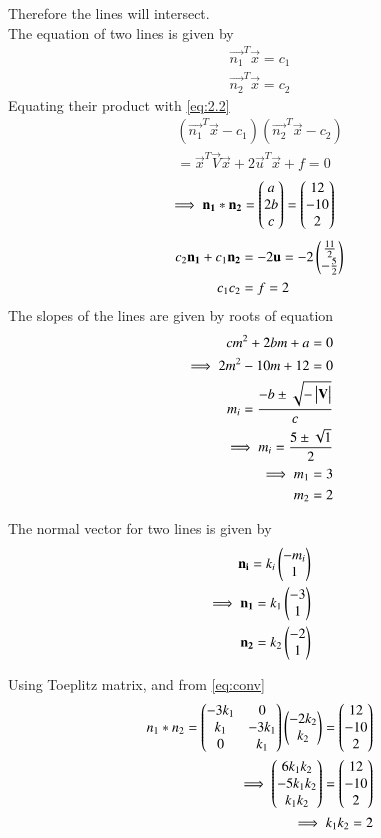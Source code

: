 \documentclass[journal,12pt,twocolumn]{IEEEtran}
\begin{document}
\noindent
Therefore the lines will intersect.\\
The equation of two lines is given by
\begin{align}
    \vec{n_1}^T\vec{x}=c_1\label{eq:2.22}\\
    \vec{n_2}^T\vec{x}=c_2\label{eq:2.23}
\end{align}
Equating their product with \eqref{eq:2.2}
\begin{multline}
    (\vec{n_1}^T\vec{x}-c_1)(\vec{n_2}^T\vec{x}-c_2)\\=\vec{x}^T\vec{V}\vec{x}+2\vec{u}^T\vec{x}+f=0
\end{multline}
\begin{align}
    \implies\mathbf{n_1}*\mathbf{n_2}&=\begin{pmatrix}a \\ 2b \\c\end{pmatrix}=\begin{pmatrix}12\\-10\\2\end{pmatrix}\label{eq:conv}
\end{align}
\begin{align}
    c_2\mathbf{n_1}+c_1\mathbf{n_2}&=-2\mathbf{u}=-2\begin{pmatrix}\frac{11}{2} \\ -\frac{5}{2}\end{pmatrix}\label{eq:2.26}\\
    c_1c_2&=f=2
\end{align}
The slopes of the lines are given by roots of equation
\begin{align}
    cm^2+2bm+a=0\label{eq:poly}\\
    \implies 2m^2-10m+12=0\\
    m_i=\frac{-b\pm{\sqrt{-\ensuremath{\begin{vmatrix}\mathbf{V}\end{vmatrix}}}}}{c}\\
    \implies m_i=\frac{5\pm{\sqrt{1}}}{2}\\
    \implies m_1=3\\
     m_2=2
\end{align}

The normal vector for two lines is given by
\begin{align}
    \mathbf{n_i}=k_i\begin{pmatrix}-m_i\\1\end{pmatrix}\label{eq:normvec}\\
    \implies\mathbf{n_1}=k_1\begin{pmatrix}-3\\1\end{pmatrix}\label{eq:n1}\\
    \mathbf{n_2}=k_2\begin{pmatrix}-2\\1\end{pmatrix}\label{eq:n2}
\end{align}

Using Toeplitz matrix, and from \eqref{eq:conv}
\begin{align}
    n_1*n_2=\begin{pmatrix}-3k_1 & 0\\k_1 & -3k_1\\0 & k_1\end{pmatrix}\begin{pmatrix}-2k_2 \\ k_2\end{pmatrix}=\begin{pmatrix}12\\-10\\2\end{pmatrix}\\
    \implies\begin{pmatrix}6k_1k_2\\-5k_1k_2\\k_1k_2\end{pmatrix}=\begin{pmatrix}12\\-10\\2\end{pmatrix}\\
    \implies k_1k_2=2
\end{align}
\end{document}
